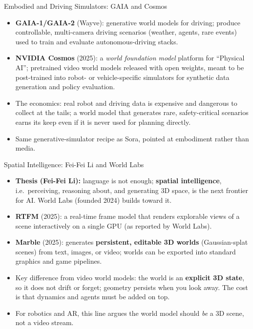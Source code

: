 \begin{frame}{Embodied and Driving Simulators: GAIA and Cosmos}
  \begin{itemize}\itemsep0.28em
    \item \textbf{GAIA-1/GAIA-2} (Wayve): generative world models for driving; produce controllable, multi-camera driving scenarios (weather, agents, rare events) used to train and evaluate autonomous-driving stacks.
    \item \textbf{NVIDIA Cosmos} (2025): a \emph{world foundation model} platform for ``Physical AI''; pretrained video world models released with open weights, meant to be post-trained into robot- or vehicle-specific simulators for synthetic data generation and policy evaluation.
    \item The economics: real robot and driving data is expensive and dangerous to collect at the tails; a world model that generates rare, safety-critical scenarios earns its keep even if it is never used for planning directly.
    \item Same generative-simulator recipe as Sora, pointed at embodiment rather than media.
  \end{itemize}
\end{frame}

\begin{frame}{Spatial Intelligence: Fei-Fei Li and World Labs}
  \begin{itemize}\itemsep0.26em
    \item \textbf{Thesis (Fei-Fei Li):} language is not enough; \textbf{spatial intelligence}, i.e.\ perceiving, reasoning about, and generating 3D space, is the next frontier for AI. World Labs (founded 2024) builds toward it.
    \item \textbf{RTFM} (2025): a real-time frame model that renders explorable views of a scene interactively on a single GPU (as reported by World Labs).
    \item \textbf{Marble} (2025): generates \textbf{persistent, editable 3D worlds} (Gaussian-splat scenes) from text, images, or video; worlds can be exported into standard graphics and game pipelines.
    \item Key difference from video world models: the world is an \textbf{explicit 3D state}, so it does not drift or forget; geometry persists when you look away. The cost is that dynamics and agents must be added on top.
    \item For robotics and AR, this line argues the world model should \emph{be} a 3D scene, not a video stream.
  \end{itemize}
\end{frame}

